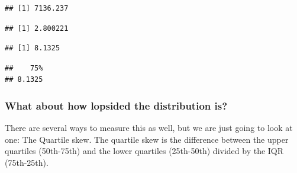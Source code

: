 \documentclass[
]{book}
\newenvironment{Shaded}{\begin{snugshade}}{\end{snugshade}}
\newcommand{\CommentTok}[1]{\textcolor[rgb]{0.56,0.35,0.01}{\textit{#1}}}
\newcommand{\DecValTok}[1]{\textcolor[rgb]{0.00,0.00,0.81}{#1}}
\newcommand{\FunctionTok}[1]{\textcolor[rgb]{0.00,0.00,0.00}{#1}}
\newcommand{\NormalTok}[1]{#1}
\newcommand{\OtherTok}[1]{\textcolor[rgb]{0.56,0.35,0.01}{#1}}
\newcommand{\SpecialCharTok}[1]{\textcolor[rgb]{0.00,0.00,0.00}{#1}}
\begin{document}
\begin{verbatim}
## [1] 7136.237
\end{verbatim}

\begin{Shaded}
\end{Shaded}

\begin{verbatim}
## [1] 2.800221
\end{verbatim}

\begin{Shaded}
\end{Shaded}

\begin{verbatim}
## [1] 8.1325
\end{verbatim}

\begin{Shaded}
\end{Shaded}

\begin{verbatim}
##    75% 
## 8.1325
\end{verbatim}

\hypertarget{what-about-how-lopsided-the-distribution-is}{%
\subsubsection{What about how lopsided the distribution is?}\label{what-about-how-lopsided-the-distribution-is}}

There are several ways to measure this as well, but we are just going to look at one: The Quartile skew. The quartile skew is the difference between the upper quartiles (50th-75th) and the lower quartiles (25th-50th) divided by the IQR (75th-25th).
\end{document}

